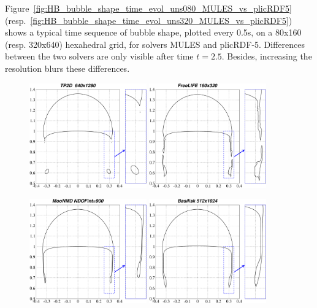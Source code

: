 \documentclass[review]{elsarticle}
\begin{document}
Figure~\ref{fig:HB_bubble_shape_time_evol_uns080_MULES_vs_plicRDF5} (resp.~\ref{fig:HB_bubble_shape_time_evol_uns320_MULES_vs_plicRDF5}) shows a typical time sequence of bubble shape, plotted every 0.5s, on a 80x160 (resp. 320x640) hexahedral grid, for solvers MULES and plicRDF-5. Differences between the two solvers are only visible after time $t=2.5$. Besides, increasing the resolution blurs these differences. 

\begin{figure}[!h]
\begin{center}
 \includegraphics[width=0.45\textwidth]{figures/bubble_shape_t=3_TP2D.pdf}
 \hspace{4mm}
 \includegraphics[width=0.45\textwidth]{figures/bubble_shape_t=3_FreeLIFE.pdf}

 \vspace{2mm}

 \includegraphics[width=0.45\textwidth]{figures/bubble_shape_t=3_MoonNMD.pdf}
 \hspace{4mm}
 \includegraphics[width=0.45\textwidth]{figures/bubble_shape_t=3_Basilisk.pdf}
 

\end{center}
\end{figure}
\end{document}
